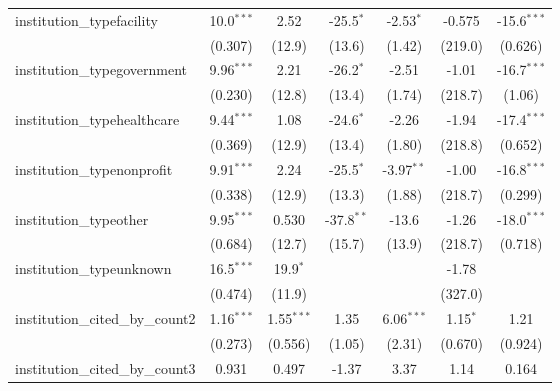 \begin{tabular}{lcccccc}
   institution\_typefacility             & 10.0$^{***}$  & 2.52         & -25.5$^{*}$  & -2.53$^{*}$   & -0.575        & -15.6$^{***}$\\   
                                         & (0.307)       & (12.9)       & (13.6)       & (1.42)        & (219.0)       & (0.626)\\   
   institution\_typegovernment           & 9.96$^{***}$  & 2.21         & -26.2$^{*}$  & -2.51         & -1.01         & -16.7$^{***}$\\   
                                         & (0.230)       & (12.8)       & (13.4)       & (1.74)        & (218.7)       & (1.06)\\   
   institution\_typehealthcare           & 9.44$^{***}$  & 1.08         & -24.6$^{*}$  & -2.26         & -1.94         & -17.4$^{***}$\\   
                                         & (0.369)       & (12.9)       & (13.4)       & (1.80)        & (218.8)       & (0.652)\\   
   institution\_typenonprofit            & 9.91$^{***}$  & 2.24         & -25.5$^{*}$  & -3.97$^{**}$  & -1.00         & -16.8$^{***}$\\   
                                         & (0.338)       & (12.9)       & (13.3)       & (1.88)        & (218.7)       & (0.299)\\   
   institution\_typeother                & 9.95$^{***}$  & 0.530        & -37.8$^{**}$ & -13.6         & -1.26         & -18.0$^{***}$\\   
                                         & (0.684)       & (12.7)       & (15.7)       & (13.9)        & (218.7)       & (0.718)\\   
   institution\_typeunknown              & 16.5$^{***}$  & 19.9$^{*}$   &              &               & -1.78         &   \\   
                                         & (0.474)       & (11.9)       &              &               & (327.0)       &   \\   
   institution\_cited\_by\_count2        & 1.16$^{***}$  & 1.55$^{***}$ & 1.35         & 6.06$^{***}$  & 1.15$^{*}$    & 1.21\\   
                                         & (0.273)       & (0.556)      & (1.05)       & (2.31)        & (0.670)       & (0.924)\\   
   institution\_cited\_by\_count3        & 0.931         & 0.497        & -1.37        & 3.37          & 1.14          & 0.164\\   

\end{tabular}
